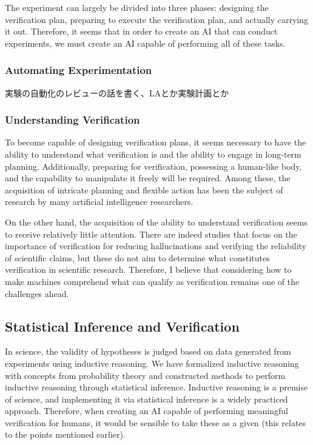 The experiment can largely be divided into three phases: designing the verification plan, preparing to execute the verification plan, and actually carrying it out. Therefore, it seems that in order to create an AI that can conduct experiments, we must create an AI capable of performing all of these tasks.

\subsubsection{Automating Experimentation}
実験の自動化のレビューの話を書く、LAとか実験計画とか

\subsubsection{Understanding Verification}
To become capable of designing verification plans, it seems necessary to have the ability to understand what verification is and the ability to engage in long-term planning. Additionally, preparing for verification, possessing a human-like body, and the capability to manipulate it freely will be required. Among these, the acquisition of intricate planning and flexible action has been the subject of research by many artificial intelligence researchers.

On the other hand, the acquisition of the ability to understand verification seems to receive relatively little attention. There are indeed studies that focus on the importance of verification for reducing hallucinations and verifying the reliability of scientific claims, but these do not aim to determine what constitutes verification in scientific research. Therefore, I believe that considering how to make machines comprehend what can qualify as verification remains one of the challenges ahead.

\subsection{Statistical Inference and Verification}
In science, the validity of hypotheses is judged based on data generated from experiments using inductive reasoning. We have formalized inductive reasoning with concepts from probability theory and constructed methods to perform inductive reasoning through statistical inference. Inductive reasoning is a premise of science, and implementing it via statistical inference is a widely practiced approach. Therefore, when creating an AI capable of performing meaningful verification for humans, it would be sensible to take these as a given (this relates to the points mentioned earlier).

